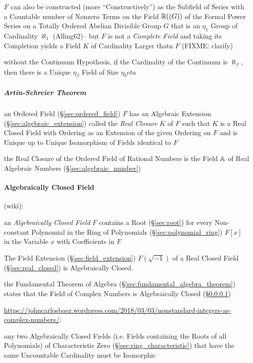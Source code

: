 $F$ can also be constructed (more ``Constructively'') as the Subfield of Series
with a Countable number of Nonzero Terms on the Field $\mathbb{R}((G))$ of the
Formal Power Series on a Totally Ordered Abelian Divisible Group $G$ that is an
$\eta_1$ Group of Cardinality $\aleph_1$ (Alling62)-- but $F$ is not a
\emph{Complete Field} and taking its Completion yields a Field $K$ of
Cardinality Larger thatn $F$ (FIXME: clarify)

without the Continuum Hypothesis, if the Cardinality of the Continuum is
$\aleph_\beta$, then there is a Unique $\eta_\beta$ Field of Size $\eta_beta$



\subparagraph{Artin-Schreier Theorem}\label{sec:artin_schreier}\hfill

an Ordered Field (\S\ref{sec:ordered_field}) $F$ has an Algebraic Extension
(\S\ref{sec:algebraic_extension}) called the \emph{Real Closure} $K$ of $F$
such that $K$ is a Real Closed Field with Ordering as an Extension of the given
Ordering on $F$ and is Unique up to Unique Isomorphism of Fields identical to
$F$

the Real Closure of the Ordered Field of Rational Numbers is the Field
$\mathbb{A}$ of Real Algebraic Numbers (\S\ref{sec:algebraic_number})



\paragraph{Algebraically Closed Field}\label{sec:algebraically_closed}
\hfill

(wiki):

an \emph{Algebraically Closed Field} $F$ contains a
Root (\S\ref{sec:root}) for every Non-constant Polynomial in the Ring of
Polynomials (\S\ref{sec:polynomial_ring}) $F[x]$ in the Variable $x$ with
Coefficients in $F$

The Field Extension (\S\ref{sec:field_extension}) $F(\sqrt{-1})$ of a
Real Closed Field (\S\ref{sec:real_closed}) is Algebraically Closed.

the Fundamental Theorem of Algebra (\S\ref{sec:fundamental_algebra_theorem})
states that the Field of Complex Numbers is Algebraically Closed
(\S\ref{sec:algebraically_closed})

\url{https://johncarlosbaez.wordpress.com/2018/03/03/nonstandard-integers-as-complex-numbers/}:

any two Algebraically Closed Fields (i.e. Fields containing the Roots of all
Polynomials) of Characteristic Zero (\S\ref{sec:ring_characteristic}) that have
the same Uncountable Cardinality must be Isomorphic

